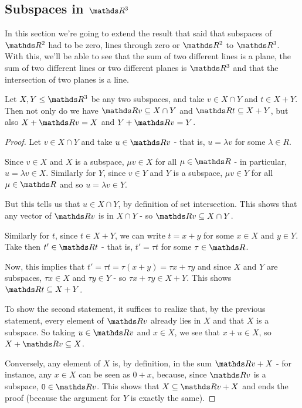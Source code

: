 \newpage
\subsection{Subspaces in $\R^3$}

In this section we're going to extend the result that said that subspaces of $\R^2$ had to be zero, lines through zero or $\R^2$ to $\R^3$. With this, we'll be able to see that the sum of two different lines is a plane, the sum of two different lines or two different planes is $\R^3$ and that the intersection of two planes is a line.

\begin{lemma}
	Let $X,Y\leq \R^3$ be any two subspaces, and take $v\in X\cap Y$ and $t\in X+Y$. Then not only do we have $\R v\subseteq X\cap Y$ and $\R t\subseteq X+Y$, but also $X+\R v=X$ and $Y+\R v=Y$.
\end{lemma}
\begin{proof}
	Let $v\in X\cap Y$ and take $u\in \R v$ - that is, $u=\lambda v$ for some $\lambda\in R$.
	
	Since $v\in X$ and $X$ is a subspace, $\mu v\in X$ for all $\mu\in \R$ - in particular, $u=\lambda v\in X$. Similarly for $Y$, since $v\in Y$ and $Y$ is a subspace, $\mu v\in Y$ for all $\mu\in \R$ and so $u=\lambda v\in Y$.
	
	But this tells us that $u\in X\cap Y$, by definition of set intersection. This shows that any vector of $\R v$ is in $X\cap Y$ - so $\R v\subseteq X\cap Y$.
	
	\bigskip
	Similarly for $t$, since $t\in X+Y$, we can write $t=x+y$ for some $x\in X$ and $y\in Y$. Take then $t'\in \R t$ - that is, $t'=\tau t$ for some $\tau\in \R$.
	
	Now, this implies that $t'=\tau t=\tau(x+y)=\tau x+\tau y$ and since $X$ and $Y$ are subspaces, $\tau x\in X$ and $\tau y\in Y$ - so $\tau x+\tau y\in X+Y$. This shows $\R t\subseteq X+Y$.	
	
	\bigskip
	To show the second statement, it suffices to realize that, by the previous statement, every element of $\R v$ already lies in $X$ and that $X$ is a subspace. So taking $u\in \R v$ and $x\in X$, we see that $x+u\in X$, so $X+\R v\subseteq X$.
	
	Conversely, any element of $X$ is, by definition, in the sum $\R v+X$ - for instance, any $x\in X$ can be seen as $0+x$, because, since $\R v$ is a subspace, $0\in \R v$. This shows that $X\subseteq \R v+X$ and ends the proof (because the argument for $Y$ is exactly the same).
\end{proof}

